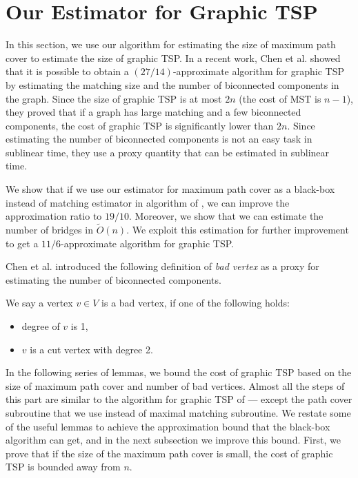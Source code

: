 \section{Our Estimator for Graphic TSP}\label{sec:graphic-TSP-minor}
In this section, we use our algorithm for estimating the size of maximum path cover to estimate the size of graphic TSP. In a recent work, Chen et al. \cite{chen2020} showed that it is possible to obtain a $(27/14)$-approximate algorithm for graphic TSP by estimating the matching size and the number of biconnected components in the graph. Since the size of graphic TSP is at most $2n$ (the cost of MST is $n-1$), they proved that if a graph has large matching and a few biconnected components, the cost of graphic TSP is significantly lower than $2n$. Since estimating the number of biconnected components is not an easy task in sublinear time, they use a proxy quantity that can be estimated in sublinear time.

We show that if we use our estimator for maximum path cover as a black-box instead of matching estimator in algorithm of \cite{chen2020}, we can improve the approximation ratio to $19/10$. Moreover, we show that we can estimate the number of bridges in $\tilde{O}(n)$. We exploit this estimation for further improvement to get a $11/6$-approximate algorithm for graphic TSP. 

Chen et al. \cite{chen2020} introduced the following definition of {\em bad vertex} as a proxy for estimating the number of biconnected components.

\begin{definition}
We say a vertex $v \in V$ is a bad vertex, if one of the following holds:
\begin{itemize}
    \item degree of $v$ is 1,
    \item $v$ is a cut vertex with degree 2.
\end{itemize}
\end{definition}


In the following series of lemmas, we bound the cost of graphic TSP based on the size of maximum path cover and number of bad vertices. Almost all the steps of this part are similar to the algorithm for graphic TSP of \cite{chen2020} --- except the path cover subroutine that we use instead of maximal matching subroutine. We restate some of the useful lemmas to achieve the approximation bound that the black-box algorithm can get, and in the next subsection we improve this bound. First, we prove that if the size of the maximum path cover is small, the cost of graphic TSP is bounded away from $n$.


